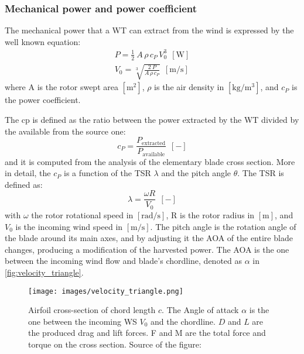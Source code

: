 \subsubsection{Mechanical power and power coefficient}\label{subsec:mech_pow_and_pow_coeff}
The mechanical power that a \acrshort{WT} can extract from the wind is expressed by the well known equation:
\begin{gather}
    P = \frac{1}{2}\ A \, \rho \, c_P \, V_0^3 \ \ \left[\si{\watt}\right] \label{eq:power} \\
    V_0 = \sqrt[3]{\frac{2 \ P}{A \, \rho \, c_P}} \ \ \left[\si{\meter \per \second}\right] 
\end{gather}
where A is the rotor swept area $\left[\si{\square \meter}\right]$, $\rho$ is the air density in $\left[\si{\kilo\gram\per\cubic\meter}\right]$, and $c_P$ is the power coefficient. 

The \acrfull{cp} is defined as the ratio between the power extracted by the \acrshort{WT} divided by the available from the source one:
\begin{equation}
    c_P = \frac{P_{\text{extracted}}}{P_{\text{available}}} \ \ \left[-\right]
    \label{eq:c_P}
\end{equation}
and it is computed from the analysis of the elementary blade cross section. More in detail, the $c_P$ is a function of the \acrfull{TSR} $\lambda$ and the pitch angle $\theta$. The \acrshort{TSR} is defined as:
\begin{equation}
    \lambda = \frac{\omega R}{V_0} \ \ \left[-\right]
    \label{eq:TSR}
\end{equation}
with $\omega$ the rotor rotational speed in $\left[\si{\radian \per \second}\right]$, R is the rotor radius in $\left[\si{\meter}\right]$, and $V_0$ is the incoming wind speed in  $\left[\si{\meter \per \second}\right]$. The pitch angle is the rotation angle of the blade around its main axes, and by adjusting it the \acrfull{AOA} of the entire blade changes, producing a modification of the harvested power. The \acrshort{AOA} is the one between the incoming wind flow and blade's chordline, denoted as $\alpha$ in \autoref{fig:velocity_triangle}. 
\begin{figure}[htb]
    \centering
    \texttt{[image: images/velocity\_triangle.png]}
    \caption{Airfoil cross-section of chord length $c$. The Angle of attack $\alpha$ is the one between the incoming \acrshort{WS} $V_0$ and the chordline. $D$ and $L$ are the produced drag and lift forces. F and M are the total force and torque on the cross section. Source of the figure: \cite{Aerodynamics_of_wind_turbines}}
    \label{fig:velocity_triangle}
\end{figure}

